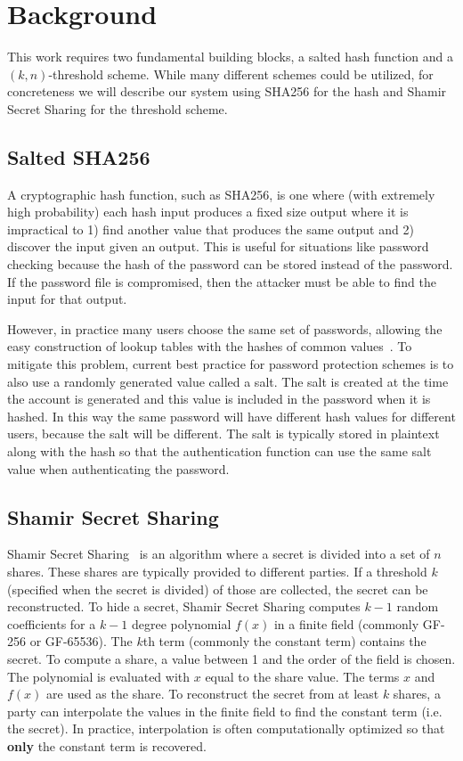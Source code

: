 \section{Background}
\label{sec-background}

This work requires two fundamental building blocks, a 
salted hash function and a $(k,n)$-threshold scheme.   While many
different schemes could be utilized, for concreteness we will describe our
system using SHA256 for the hash and Shamir Secret Sharing for the 
threshold scheme.

\subsection{Salted SHA256}

A cryptographic hash function, such as SHA256, is one where (with extremely 
high probability) 
each hash input produces a fixed size output where it is impractical to 1) 
find another value that produces the same output and 2) discover the input 
given an output.  This is useful for situations like password checking because 
the hash of the password can be stored instead of the password.   If 
the password file is compromised, then the attacker must be able to find the 
input for that output.   

However, in practice many users choose the same set of passwords, allowing the
easy construction of lookup tables with the hashes of common 
values~\cite{rainbowtable}.  To mitigate this problem, current best practice for
password protection schemes is to also use a randomly generated value called a 
salt.   The salt is created at the time the account is generated and this value
is included in the password when it is hashed.   In this way the same password 
will have different hash values for different users, because the salt will be 
different.   The salt is typically stored in plaintext along with the 
hash so that the authentication function can use the same salt value when 
authenticating the password.


\subsection{Shamir Secret Sharing}

Shamir Secret Sharing~\cite{shamir1979share} is an algorithm where a
secret is divided into a set of $n$ shares.   These shares are typically
provided to different parties.
If a threshold $k$ (specified when the secret is divided) of those are 
collected, the secret can be reconstructed.   To hide a secret, Shamir Secret 
Sharing computes $k-1$ random coefficients for a $k-1$ degree polynomial 
$f(x)$ in
a finite field (commonly GF-256 or GF-65536).   The $k$th term (commonly the
constant term) contains the secret.  
 To compute a share, a value between 1
and the order of the field is chosen.   The polynomial is evaluated 
with $x$ equal to the share value.   The terms $x$ and $f(x)$ are used as the
share.   
To reconstruct the secret from at least $k$ shares, a party can
interpolate the values in the finite field to find the constant term (i.e. the 
secret).   In practice, interpolation is often computationally optimized so 
that {\bf only} the constant term is recovered.

